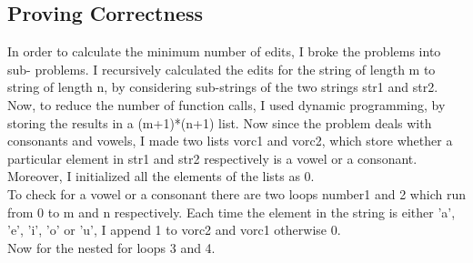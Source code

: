 \documentclass{article}
\begin{document}
\subsection{Proving Correctness}
In order to calculate the minimum number of edits, I broke the problems into sub- problems. I recursively calculated the edits for the string of length m to string of length n, by considering sub-strings of the two strings str1 and str2. Now, to reduce the number of function calls, I used dynamic programming, by storing the results in a (m+1)*(n+1) list. Now since the problem deals with consonants and vowels, I made two lists vorc1 and vorc2, which store whether a particular element in str1 and str2 respectively is a vowel or a consonant. Moreover, I initialized all the elements of the lists as 0.\\
To check for a vowel or a consonant there are two loops number1 and 2 which run from 0 to m and n respectively. Each time the element in the string is either 'a', 'e', 'i', 'o' or 'u', I append 1 to vorc2 and vorc1 otherwise 0.\\
Now for the nested for loops 3 and 4.\\
\end{document}
